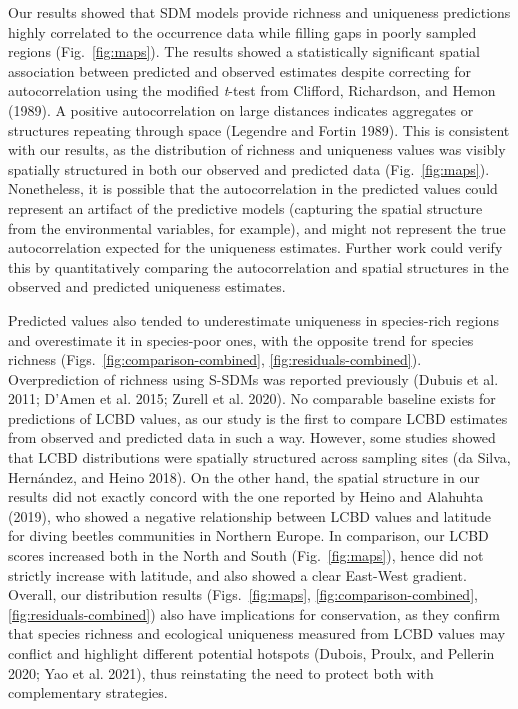 \documentclass[11pt]{article}
\begin{document}
Our results showed that SDM models provide richness and uniqueness
predictions highly correlated to the occurrence data while filling gaps
in poorly sampled regions (Fig.~\ref{fig:maps}). The results showed a
statistically significant spatial association between predicted and
observed estimates despite correcting for autocorrelation using the
modified \emph{t}-test from Clifford, Richardson, and Hemon (1989). A
positive autocorrelation on large distances indicates aggregates or
structures repeating through space (Legendre and Fortin 1989). This is
consistent with our results, as the distribution of richness and
uniqueness values was visibly spatially structured in both our observed
and predicted data (Fig.~\ref{fig:maps}). Nonetheless, it is possible
that the autocorrelation in the predicted values could represent an
artifact of the predictive models (capturing the spatial structure from
the environmental variables, for example), and might not represent the
true autocorrelation expected for the uniqueness estimates. Further work
could verify this by quantitatively comparing the autocorrelation and
spatial structures in the observed and predicted uniqueness estimates.

Predicted values also tended to underestimate uniqueness in species-rich
regions and overestimate it in species-poor ones, with the opposite
trend for species richness
(Figs.~\ref{fig:comparison-combined}, \ref{fig:residuals-combined}).
Overprediction of richness using S-SDMs was reported previously (Dubuis
et al. 2011; D'Amen et al. 2015; Zurell et al. 2020). No comparable
baseline exists for predictions of LCBD values, as our study is the
first to compare LCBD estimates from observed and predicted data in such
a way. However, some studies showed that LCBD distributions were
spatially structured across sampling sites (da Silva, Hernández, and
Heino 2018). On the other hand, the spatial structure in our results did
not exactly concord with the one reported by Heino and Alahuhta (2019),
who showed a negative relationship between LCBD values and latitude for
diving beetles communities in Northern Europe. In comparison, our LCBD
scores increased both in the North and South (Fig.~\ref{fig:maps}),
hence did not strictly increase with latitude, and also showed a clear
East-West gradient. Overall, our distribution results
(Figs.~\ref{fig:maps}, \ref{fig:comparison-combined}, \ref{fig:residuals-combined})
also have implications for conservation, as they confirm that species
richness and ecological uniqueness measured from LCBD values may
conflict and highlight different potential hotspots (Dubois, Proulx, and
Pellerin 2020; Yao et al. 2021), thus reinstating the need to protect
both with complementary strategies.
\end{document}
